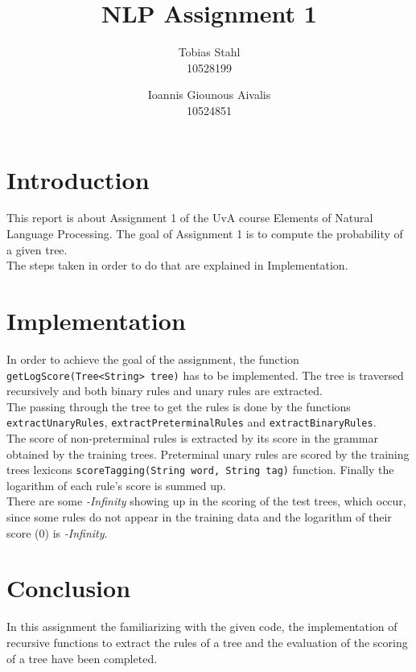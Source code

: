 \documentclass[11pt]{article}
\title{
	\textbf{NLP Assignment 1}
}
\author{Tobias Stahl \\ 10528199 \and Ioannis Giounous Aivalis \\ 10524851 }
\begin{document}
\maketitle


\section{Introduction}
This report is about Assignment 1 of the UvA course Elements of Natural Language Processing. The goal of Assignment 1 is to compute the probability of a given tree.\\
The steps taken in order to do that are explained in Implementation.

\section{Implementation}
In order to achieve the goal of the assignment, the function \texttt {getLogScore(Tree<String> tree)} has to be implemented. The tree is traversed recursively and both binary rules and unary rules are extracted.\\
The passing through the tree to get the rules is done by the functions \texttt{extractUnaryRules}, \texttt{extractPreterminalRules} and \texttt{extractBinaryRules}.\\
The score of non-preterminal rules is extracted by its score in the grammar obtained by the training trees. Preterminal unary rules are scored by the training trees lexicons \texttt{scoreTagging(String word, String tag)} function.
Finally the logarithm of each rule's score is summed up.\\
There are some \emph{-Infinity} showing up in the scoring of the test trees, which occur, since some rules do not appear in the training data and the logarithm of their score (0) is \emph{-Infinity}.\\

\section{Conclusion}
In this assignment the familiarizing with the given code, the implementation of recursive functions to extract the rules of a tree and the evaluation of the scoring of a tree have been completed.
\end{document}
